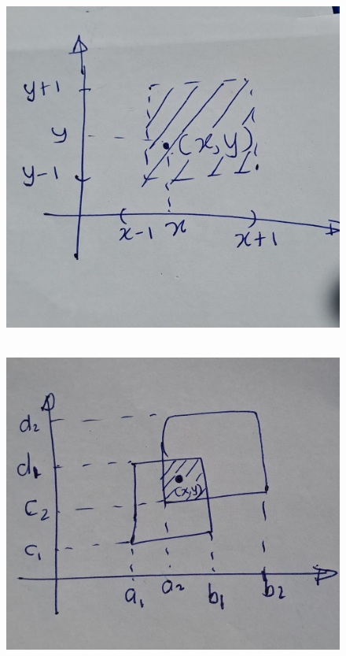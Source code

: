 \documentclass[
]{book}
\theoremstyle{definition}
\theoremstyle{definition}
\theoremstyle{definition}
\theoremstyle{definition}
\theoremstyle{remark}
\begin{document}
\begin{figure}
\centering
\includegraphics{figures/figure 04.jpg}
\caption{\label{fig:fig4}\(~\)}
\end{figure}

\begin{figure}
\centering
\includegraphics{figures/figure 05.jpg}
\caption{\label{fig:fig5}\(~\)}
\end{figure}
\end{document}
